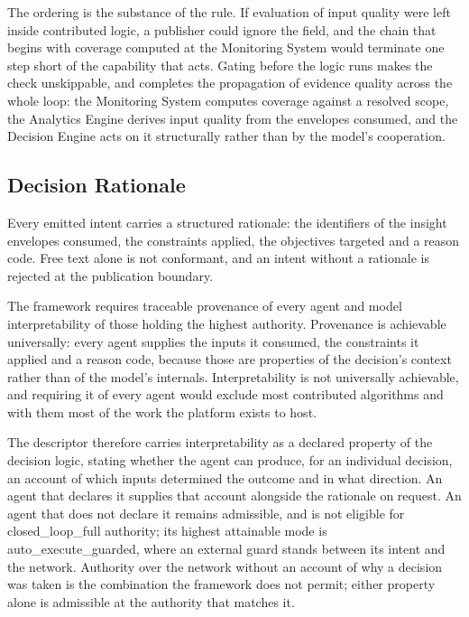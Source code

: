 The ordering is the substance of the rule. If evaluation of input
quality were left inside contributed logic, a publisher could ignore the
field, and the chain that begins with coverage computed at the
Monitoring System would terminate one step short of the capability that
acts. Gating before the logic runs makes the check unskippable, and
completes the propagation of evidence quality across the whole loop: the
Monitoring System computes coverage against a resolved scope, the
Analytics Engine derives input quality from the envelopes consumed, and
the Decision Engine acts on it structurally rather than by the model's
cooperation.

\hypertarget{decision-rationale}{%
\subsection{Decision Rationale}\label{decision-rationale}}

Every emitted intent carries a structured rationale: the identifiers of
the insight envelopes consumed, the constraints applied, the objectives
targeted and a reason code. Free text alone is not conformant, and an
intent without a rationale is rejected at the publication boundary.

The framework requires traceable provenance of every agent and model
interpretability of those holding the highest authority. Provenance is
achievable universally: every agent supplies the inputs it consumed, the
constraints it applied and a reason code, because those are properties
of the decision's context rather than of the model's internals.
Interpretability is not universally achievable, and requiring it of
every agent would exclude most contributed algorithms and with them most
of the work the platform exists to host.

The descriptor therefore carries interpretability as a declared property
of the decision logic, stating whether the agent can produce, for an
individual decision, an account of which inputs determined the outcome
and in what direction. An agent that declares it supplies that account
alongside the rationale on request. An agent that does not declare it
remains admissible, and is not eligible for
closed\_\allowbreak{}loop\_\allowbreak{}full authority; its highest
attainable mode is auto\_\allowbreak{}execute\_\allowbreak{}guarded,
where an external guard stands between its intent and the network.
Authority over the network without an account of why a decision was
taken is the combination the framework does not permit; either property
alone is admissible at the authority that matches it.

